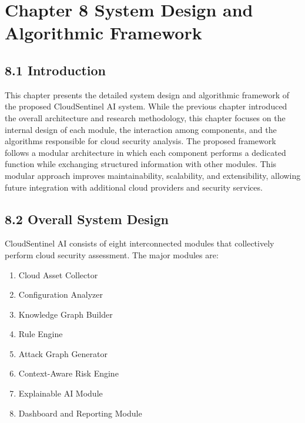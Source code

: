 \section{Chapter 8 System Design and Algorithmic Framework}

\subsection{8.1 Introduction}

This chapter presents the detailed system design and algorithmic framework of the proposed CloudSentinel AI system. While the previous chapter introduced the overall architecture and research methodology, this chapter focuses on the internal design of each module, the interaction among components, and the algorithms responsible for cloud security analysis. The proposed framework follows a modular architecture in which each component performs a dedicated function while exchanging structured information with other modules. This modular approach improves maintainability, scalability, and extensibility, allowing future integration with additional cloud providers and security services.

\subsection{8.2 Overall System Design}

CloudSentinel AI consists of eight interconnected modules that collectively perform cloud security assessment. The major modules are:

\begin{enumerate}
\def\labelenumi{\arabic{enumi}.}
\tightlist
\item
  Cloud Asset Collector\\
\item
  Configuration Analyzer\\
\item
  Knowledge Graph Builder\\
\item
  Rule Engine\\
\item
  Attack Graph Generator\\
\item
  Context-Aware Risk Engine\\
\item
  Explainable AI Module\\
\item
  Dashboard and Reporting Module
\end{enumerate}

